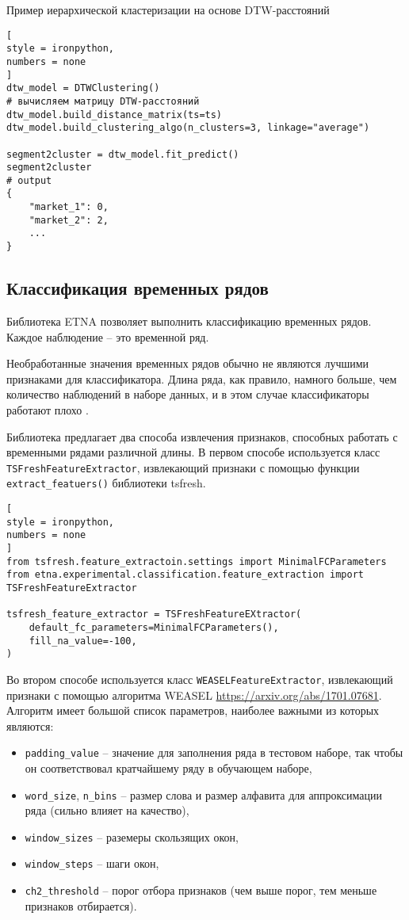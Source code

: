 \documentclass[%
	11pt,
	a4paper,
	utf8,
		]{article}
\begin{document}
Пример иерархической кластеризации на основе DTW-расстояний
\begin{lstlisting}[
style = ironpython,
numbers = none
]
dtw_model = DTWClustering()
# вычисляем матрицу DTW-расстояний
dtw_model.build_distance_matrix(ts=ts)
dtw_model.build_clustering_algo(n_clusters=3, linkage="average")

segment2cluster = dtw_model.fit_predict()
segment2cluster
# output
{
    "market_1": 0,
    "market_2": 2,
    ...
}
\end{lstlisting}

\subsection{Классификация временных рядов}

Библиотека ETNA позволяет выполнить классификацию временных рядов. Каждое наблюдение -- это временной ряд. 

Необработанные значения временных рядов обычно не являются лучшими признаками для классификатора. Длина ряда, как правило, намного больше, чем количество наблюдений в наборе данных, и в этом случае классификаторы работают плохо \cite[]{gruzdev:time-series-2022}.

Библиотека предлагает два способа извлечения признаков, способных работать с временными рядами различной длины. В первом способе используется класс \verb|TSFreshFeatureExtractor|, извлекающий признаки с помощью функции \verb|extract_featuers()| библиотеки tsfresh.
\begin{lstlisting}[
style = ironpython,
numbers = none
]
from tsfresh.feature_extractoin.settings import MinimalFCParameters
from etna.experimental.classification.feature_extraction import TSFreshFeatureExtractor

tsfresh_feature_extractor = TSFreshFeatureEXtractor(
    default_fc_parameters=MinimalFCParameters(),
    fill_na_value=-100,
)
\end{lstlisting}

Во втором способе используется класс \verb|WEASELFeatureExtractor|, извлекающий признаки с помощью алгоритма WEASEL \url{https://arxiv.org/abs/1701.07681}. Алгоритм имеет большой список параметров, наиболее важными из которых являются:
\begin{itemize}
	\item \verb|padding_value| -- значение для заполнения ряда в тестовом наборе, так чтобы он соответствовал кратчайшему ряду в обучающем наборе,
	
	\item \verb|word_size|, \verb|n_bins| -- размер слова и размер алфавита для аппроксимации ряда (сильно влияет на качество),
	
	\item \verb|window_sizes| -- раземеры скользящих окон,
	
	\item \verb|window_steps| -- шаги окон,
	
	\item \verb|ch2_threshold| -- порог отбора признаков (чем выше порог, тем меньше признаков отбирается). 
\end{itemize}
\end{document}
